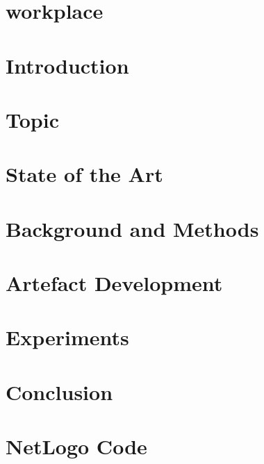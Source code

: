 \documentclass[12pt]{report}
\begin{document}

\pagestyle{fancy}
\rfoot{\thepage}
\cfoot{}






\newpage
\tableofcontents
\listoffigures
\listoftables
\clearpage


\pagestyle{plain}

\chapter{workplace}
\label{sec:workplace}


\chapter{Introduction}
\label{sec:intro}


\chapter{Topic}
\label{sec:Slimemold}


\chapter{State of the Art}
\label{sec:relatedwork}


\chapter{Background and Methods}
\label{sec:methods}


\chapter{Artefact Development}
\label{sec:implementation}


\chapter{Experiments}
\label{sec:experiments}


\chapter{Conclusion}
\label{sec:conclusion}


\newpage




\newpage

\appendix
{}
\chapter{NetLogo Code}
\label{sec:appendix-netlogo}



\end{document}
